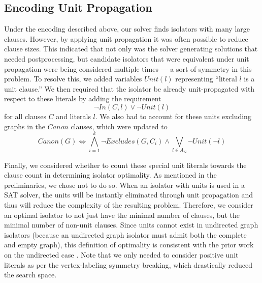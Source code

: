 \documentclass[conference]{IEEEtran}
\begin{document}
\subsection{Encoding Unit Propagation}

Under the encoding described above, our solver finds isolators with many large clauses. However, by applying unit propagation it was often possible to reduce clause sizes. This indicated that not only was the solver generating solutions that needed postprocessing, but candidate isolators that were equivalent under unit propagation were being considered multiple times --- a sort of symmetry in this problem.  To resolve this, we added variables $\mathit{Unit}(l)$ representing ``literal $l$ is a unit clause.'' We then required that the isolator be already unit-propagated with respect to these literals by adding the requirement
$$\lnot \mathit{In}(C, l) \lor \lnot \mathit{Unit}(l)$$
for all clauses $C$ and literals $l$. We also had to account for these units excluding graphs in the $\mathit{Canon}$ clauses, which were updated to
$$\mathit{Canon}(G) \Leftrightarrow \bigwedge\limits_{i=1}^k \lnot \mathit{Excludes}(G,C_i) \land \bigvee\limits_{l \in A_G}\lnot \mathit{Unit}(\lnot l)$$


Finally, we considered whether to count these special unit literals towards the clause count in determining isolator optimality. As mentioned in the preliminaries, we chose not to do so. When an isolator with units is used in a SAT solver, the units will be instantly eliminated through unit propagation and thus will reduce the complexity of the resulting problem.  Therefore, we consider an optimal isolator to not just have the minimal number of clauses, but the minimal number of non-unit clauses.  Since units cannot exist in undirected graph isolators (because an undirected graph isolator must admit both the complete and empty graph), this definition of optimality is consistent with the prior work on the undirected case \cite{ref_heule}. Note that we only needed to consider positive unit literals as per the vertex-labeling symmetry breaking, which drastically reduced the search space.

\end{document}

